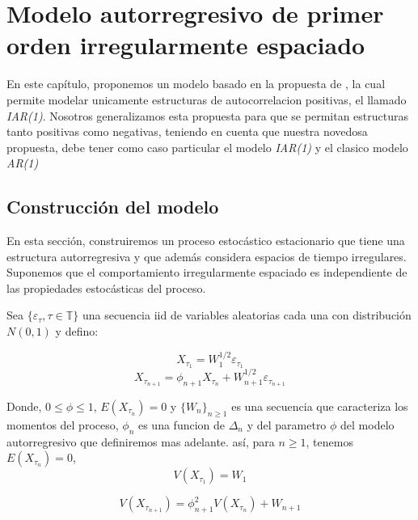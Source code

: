 \chapter{Modelo autorregresivo de primer orden irregularmente espaciado}


En este capítulo, proponemos un modelo basado en la propuesta de \cite{eyheramendy2018irregular}, la cual permite modelar
unicamente estructuras de autocorrelacion positivas, el llamado \emph{IAR(1)}. Nosotros generalizamos esta propuesta para que se permitan
estructuras tanto positivas como negativas, teniendo en cuenta que nuestra novedosa propuesta,
debe tener como caso particular el modelo \emph{IAR(1)} y el clasico modelo \emph{AR(1)} 


\section{Construcción del modelo}

En esta sección, construiremos un proceso estocástico estacionario  que tiene una
estructura autorregresiva y que además considera espacios de tiempo irregulares.
Suponemos que el comportamiento irregularmente espaciado es independiente de las propiedades estocásticas del proceso.

Sea $\lbrace \varepsilon_{\tau}, \tau \in \mathbb{T} \rbrace$ una secuencia iid de variables aleatorias cada una con distribución $N(0,1)$ y defino:

\begin{equation*}
    X_{\tau_{1}} = W_1^{1/2} \varepsilon_{\tau_{1}}
\end{equation*}
\begin{equation}
    X_{\tau_{n+1}} = \phi_{n+1} X_{\tau_n} +W_{n+1}^{1/2}\varepsilon_{\tau_{n+1}}
    \label{eq:model_base}
\end{equation}

Donde, $0 \leq \phi \leq 1$, $E(X_{\tau_{n}}) = 0$ y $\lbrace W_{n} \rbrace_{n\geq 1}$ es una secuencia que caracteriza los momentos del proceso,
$\phi_n$ es una funcion de $\Delta_n$ y del parametro $\phi$ del modelo autorregresivo que
definiremos mas adelante. así, para $n\geq 1$, tenemos $E(X_{\tau_n})=0$,\\

\begin{equation*}
    V(X_{\tau_{1}})= W_1   
\end{equation*}

\begin{equation*}
    V(X_{\tau_{n+1}}) = \phi_{n+1}^{2}V(X_{\tau_{n}}) + W_{n+1}
\end{equation*}

